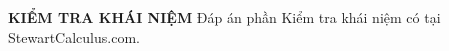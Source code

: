 \enlargethispage{25pt}
\fancyhead[RE,LO]{}
\fancyfoot[C]{}
\fancyfoot[LE,RO]{\textsf{\textbf{\thepage}}}

\noindent
\noindent\colorbox{stewartcyan!15}{\parbox{\dimexpr\linewidth-2\fboxsep\relax}{%
  \colorbox{stewartcyan}{}%
}}

\vspace{0.6em}

\noindent
{\fontsize{10}{12}\selectfont\textbf{\textsf{\color{stewartcyan}KIỂM TRA KHÁI NIỆM}}}
\hfill
{\fontsize{8}{10}\selectfont\textsf{Đáp án phần Kiểm tra khái niệm có tại StewartCalculus.com.}}

\vspace{0.4em}

